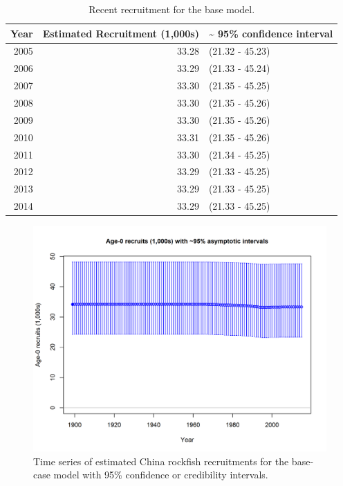 \documentclass[12pt,]{article}
\begin{document}
\begin{table}[ht]
\centering
\caption{Recent recruitment for the base model.} 
\label{tab:Recruit_mod1}
\begin{tabular}{rrl}
  \hline
Year & Estimated Recruitment (1,000s) & \~{} 95\% confidence interval \\ 
  \hline
2005 & 33.28 & (21.32 - 45.23) \\ 
  2006 & 33.29 & (21.33 - 45.24) \\ 
  2007 & 33.30 & (21.35 - 45.25) \\ 
  2008 & 33.30 & (21.35 - 45.26) \\ 
  2009 & 33.30 & (21.35 - 45.26) \\ 
  2010 & 33.31 & (21.35 - 45.26) \\ 
  2011 & 33.30 & (21.34 - 45.25) \\ 
  2012 & 33.29 & (21.33 - 45.25) \\ 
  2013 & 33.29 & (21.33 - 45.25) \\ 
  2014 & 33.29 & (21.33 - 45.25) \\ 
   \hline
\end{tabular}
\end{table}

\FloatBarrier

\begin{figure}[htbp]
\centering
\includegraphics{r4ss/plots_mod1/ts11_Age-0_recruits_(1000s)_with_95_asymptotic_intervals.png}
\caption{Time series of estimated China rockfish recruitments for the
base-case model with 95\% confidence or credibility intervals.
\label{fig:Recruits_all}}
\end{figure}
\end{document}
